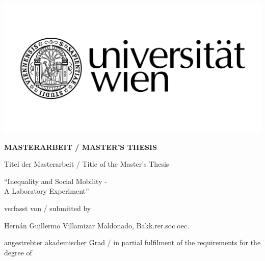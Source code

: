 \begin{titlepage}
\vspace*{-2cm}  %
\begin{flushright}
    \includegraphics[width=0.5\linewidth]{Uni_Logo_2016_SW}
\end{flushright}

\begin{center}  %
    \LARGE{\textbf{{\MakeUppercase{
        MASTERARBEIT / MASTER'S THESIS
    }}}}
    
    \vspace{1cm}
    \small{{  %
        Titel der Masterarbeit / Title of the Master's Thesis
    }}
    
    \vspace{1cm}
    \Large{{  %
        ``Inequality and Social Mobility -\\
        A Laboratory Experiment''
    }}
    
    \vspace{1cm}
    \small{{  %
        verfasst von / submitted by
    }}
    
    \Large{{  %
        Hern\'an Guillermo Villamizar Maldonado, Bakk.rer.soc.oec.
    }}
    
    \vspace{1cm}
    \small{{
        angestrebter akademischer Grad / in partial fulfilment of the requirements for the degree of  %
    }}


\end{center}
\end{titlepage}
